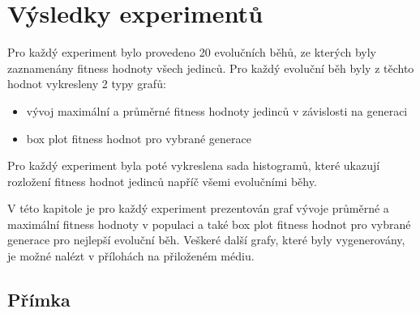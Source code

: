 \chapter{Výsledky experimentů}
Pro každý experiment bylo provedeno 20 evolučních běhů, ze kterých byly zaznamenány fitness hodnoty všech jedinců.
Pro každý evoluční běh byly z těchto hodnot vykresleny 2 typy grafů:

\begin{itemize}
    \item vývoj maximální a průměrné fitness hodnoty jedinců v závislosti na generaci
    \item box plot fitness hodnot pro vybrané generace
\end{itemize}

Pro každý experiment byla poté vykreslena sada histogramů, které ukazují rozložení fitness hodnot jedinců napříč všemi evolučními běhy.

V této kapitole je pro každý experiment prezentován graf vývoje průměrné a maximální fitness hodnoty v populaci a také box plot fitness hodnot pro vybrané generace pro nejlepší evoluční běh.
Veškeré další grafy, které byly vygenerovány, je možné nalézt v přílohách na přiloženém médiu.

\section{Přímka}

